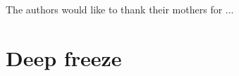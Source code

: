 \documentclass[aip,cha,showpacs,reprint]{revtex4-1} %
\newcommand{\beq}{\begin{equation}}
\newcommand{\eeq}{\end{equation}}
\newcommand{\refeq}  [1] {Eq.~(\ref{#1})}                   %
\newcommand{\ie}{{i.e.}}
\newcommand{\KSe}{Kuramoto-Siva\-shin\-sky equation}
\begin{document}
\begin{acknowledgments}
The authors would like to thank their mothers for ...
\end{acknowledgments}

\appendix

%
%
%



                \ifdraft\newpage
\section{Deep freeze\label{c-freeze}}

                \fi
\end{document}
